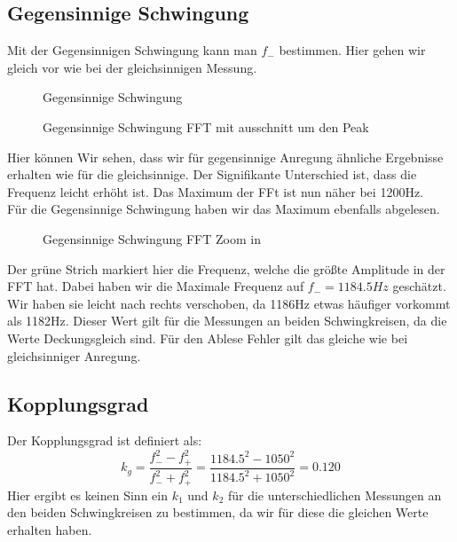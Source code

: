 \documentclass[twoside]{protokoll}
\begin{document}
 
\subsection{Gegensinnige Schwingung}

Mit der Gegensinnigen Schwingung kann man $f_-$ bestimmen. Hier gehen wir gleich vor wie bei der gleichsinnigen Messung.
\begin{figure}[H]
    \centering
    \caption{Gegensinnige Schwingung}
\end{figure}
\begin{figure}[H]
    \centering
    \caption{Gegensinnige Schwingung FFT mit ausschnitt um den Peak}
\end{figure}
Hier können Wir sehen, dass wir für gegensinnige Anregung ähnliche Ergebnisse erhalten wie für die gleichsinnige. Der Signifikante Unterschied ist, dass die Frequenz leicht erhöht ist. 
Das Maximum der FFt ist nun näher bei 1200Hz.\\
 
Für die Gegensinnige Schwingung haben wir das Maximum ebenfalls abgelesen.
\begin{figure}[H]
    \centering
    \caption{Gegensinnige Schwingung FFT Zoom in}
\end{figure}
Der grüne Strich markiert hier die Frequenz, welche die größte Amplitude in der FFT hat.
Dabei haben wir die Maximale Frequenz auf $f_-=1184.5Hz$ geschätzt.
Wir haben sie leicht nach rechts verschoben, da 1186Hz etwas häufiger vorkommt als 1182Hz.
Dieser Wert gilt für die Messungen an beiden Schwingkreisen, da die Werte Deckungsgleich sind.
Für den Ablese Fehler gilt das gleiche wie bei gleichsinniger Anregung.

\subsection{Kopplungsgrad}
Der Kopplungsgrad ist definiert als:
\begin{equation}
    k_g = \frac{f_-^2-f_+^2}{f_-^2+f_+^2} = \frac{1184.5^2-1050^2}{1184.5^2+1050^2} = 0.120
\end{equation}
Hier ergibt es keinen Sinn ein $k_1$ und $k_2$ für die unterschiedlichen Messungen an den beiden Schwingkreisen zu bestimmen, da wir für diese die gleichen Werte erhalten haben. \\
 
\end{document}
